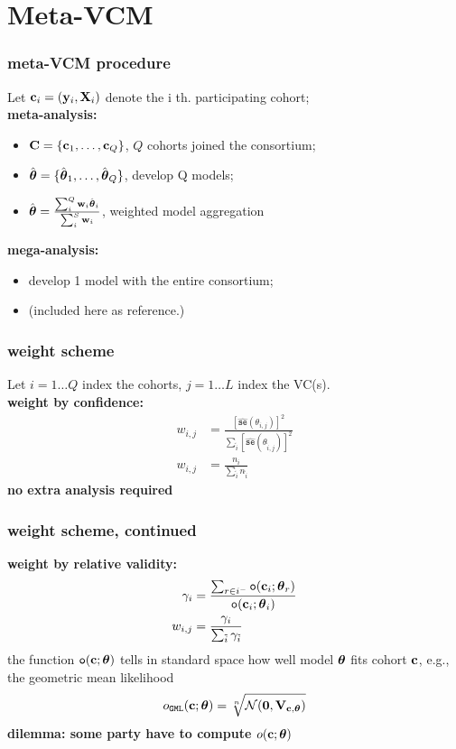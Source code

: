 \documentclass{beamer}
\begin{document}
\section{Meta-VCM}
\begin{frame}\frametitle{meta-VCM procedure}
  Let $\mathbf{c}_i=(\mathbf{y}_i, \mathbf{X}_i)$ denote the i th. participating cohort; \\
  \textbf{{\color{red}meta}-analysis:}
  \begin{itemize}
  \item $\mathbf{C} = \{\mathbf{c}_1, \dots, \mathbf{c}_Q \}$, $Q$ cohorts joined the
    consortium;
  \item $\hat{\boldsymbol{\theta}}=\{\hat{\boldsymbol{\theta}}_1, \dots, \hat{\boldsymbol{\theta}}_Q\}$,
    develop Q models;
  \item
    $\hat{\boldsymbol{\theta}} = \frac{\sum_i^Q \mathbf{w}_i \hat{\boldsymbol{\theta}}_i}{\sum_i^S
      \mathbf{w}_i}$, weighted model aggregation
  \end{itemize}
  \textbf{{\color{red}mega}-analysis:}
  \begin{itemize}
  \item develop 1 model with the entire consortium;
  \item (included here as reference.)
  \end{itemize}
\end{frame}
\newcommand{\se}[1]{\hat{\mathtt{se}}\left(#1\right)}
\newcommand{\ti}{{\tilde{i}}} \newcommand{\ef}{{\mathtt{o}}}
\begin{frame}\frametitle{weight scheme}
  Let $i = 1 \dots Q$ index the cohorts, $j = 1 \dots L$ index the VC(s).\\
  \textbf{weight by confidence:}
  \begin{align}
    w_{i,j} &= \frac{\left[\se{\theta_{i,j}} \right ]^2}
              {\sum_\ti \left[\se{\theta_{\ti,j}} \right ]^2} \\
    w_{i,j} &= \frac{n_i}{\sum_\ti n_\ti}
  \end{align}
  {\color{blue}\textbf{no extra analysis required}}
\end{frame}
\begin{frame}\frametitle{weight scheme, continued}
  \textbf{weight by relative validity:}
  \begin{align}
    \gamma_i &= \frac{\sum_{r \in i^-}{\ef( \vc_i; \vtheta_r)}}
               {\ef(\vc_i; \vtheta_i)} \\
    w_{i,j}  &= \frac{\gamma_i}{\sum_\ti \gamma_\ti}
  \end{align}
  the function $\ef(\vc;\vtheta)$ tells in standard space how well
  model $\boldsymbol{\theta}$ fits cohort $\mathbf{c}$, e.g., the geometric mean
  likelihood
  \begin{align}
    o_\mathtt{GML}(\mathbf{c}; \boldsymbol{\theta}) = \sqrt[n]{\mathcal{N}(\boldsymbol{0}, \mathbf{V}_{\mathbf{c}, \boldsymbol{\theta}})}
  \end{align}
  {\color{red}\textbf{dilemma: some party have to compute
      $o(\mathbf{c}; \boldsymbol{\theta})$}}
\end{frame}
\end{document}
